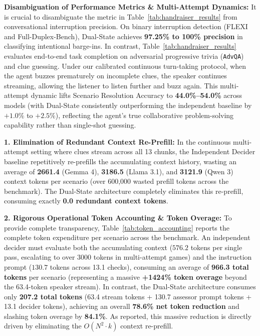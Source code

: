 \documentclass{article}
\begin{document}
\textbf{Disambiguation of Performance Metrics \& Multi-Attempt Dynamics:}
It is crucial to disambiguate the metric in Table~\ref{tab:handraiser_results} from conversational interruption precision. On binary interruption detection (FLEXI and Full-Duplex-Bench), Dual-State achieves \textbf{97.25\% to 100\% precision} in classifying intentional barge-ins. In contrast, Table~\ref{tab:handraiser_results} evaluates end-to-end task completion on adversarial progressive trivia (\texttt{AdvQA}) and clue guessing. Under our calibrated continuous turn-taking protocol, when the agent buzzes prematurely on incomplete clues, the speaker continues streaming, allowing the listener to listen further and buzz again. This multi-attempt dynamic lifts Scenario Resolution Accuracy to \textbf{44.0\%--54.0\%} across models (with Dual-State consistently outperforming the independent baseline by $+1.0\%$ to $+2.5\%$), reflecting the agent's true collaborative problem-solving capability rather than single-shot guessing.

\textbf{1. Elimination of Redundant Context Re-Prefill:}
In the continuous multi-attempt setting where clues stream across all 13 chunks, the Independent Decider baseline repetitively re-prefills the accumulating context history, wasting an average of \textbf{2661.4} (Gemma 4), \textbf{3186.5} (Llama 3.1), and \textbf{3121.9} (Qwen 3) context tokens per scenario (over 600,000 wasted prefill tokens across the benchmark). The Dual-State architecture completely eliminates this re-prefill, consuming exactly \textbf{0.0 redundant context tokens}.

\textbf{2. Rigorous Operational Token Accounting \& Token Overage:}
To provide complete transparency, Table~\ref{tab:token_accounting} reports the complete token expenditure per scenario across the benchmark. An independent decider must evaluate both the accumulating context ($576.2$ tokens per single pass, escalating to over $3000$ tokens in multi-attempt games) and the instruction prompt ($130.7$ tokens across 13.1 checks), consuming an average of \textbf{966.3 total tokens} per scenario (representing a massive \textbf{+1424\% token overage} beyond the 63.4-token speaker stream). In contrast, the Dual-State architecture consumes only \textbf{207.2 total tokens} (63.4 stream tokens + 130.7 assessor prompt tokens + 13.1 decider tokens), achieving an overall \textbf{78.6\% net token reduction} and slashing token overage by \textbf{84.1\%}. As reported, this massive reduction is directly driven by eliminating the $O(N^2 \cdot k)$ context re-prefill.
\end{document}
